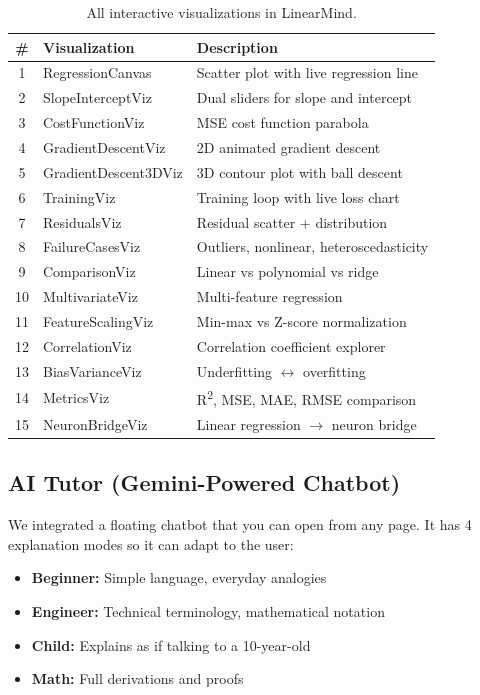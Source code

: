 \documentclass[12pt, a4paper]{article}
\begin{document}
\begin{table}[H]
\centering
\small
\begin{tabular}{c l p{7.5cm}}
\toprule
\textbf{\#} & \textbf{Visualization} & \textbf{Description} \\
\midrule
1 & RegressionCanvas & Scatter plot with live regression line \\
2 & SlopeInterceptViz & Dual sliders for slope and intercept \\
3 & CostFunctionViz & MSE cost function parabola \\
4 & GradientDescentViz & 2D animated gradient descent \\
5 & GradientDescent3DViz & 3D contour plot with ball descent \\
6 & TrainingViz & Training loop with live loss chart \\
7 & ResidualsViz & Residual scatter + distribution \\
8 & FailureCasesViz & Outliers, nonlinear, heteroscedasticity \\
9 & ComparisonViz & Linear vs polynomial vs ridge \\
10 & MultivariateViz & Multi-feature regression \\
11 & FeatureScalingViz & Min-max vs Z-score normalization \\
12 & CorrelationViz & Correlation coefficient explorer \\
13 & BiasVarianceViz & Underfitting $\leftrightarrow$ overfitting \\
14 & MetricsViz & R\textsuperscript{2}, MSE, MAE, RMSE comparison \\
15 & NeuronBridgeViz & Linear regression $\to$ neuron bridge \\
\bottomrule
\end{tabular}
\caption{All interactive visualizations in LinearMind.}
\label{tab:viz}
\end{table}

\subsection{AI Tutor (Gemini-Powered Chatbot)}

We integrated a floating chatbot that you can open from any page. It has 4 explanation modes so it can adapt to the user:
\begin{itemize}
    \item \textbf{Beginner:} Simple language, everyday analogies
    \item \textbf{Engineer:} Technical terminology, mathematical notation
    \item \textbf{Child:} Explains as if talking to a 10-year-old
    \item \textbf{Math:} Full derivations and proofs
\end{itemize}
\end{document}
